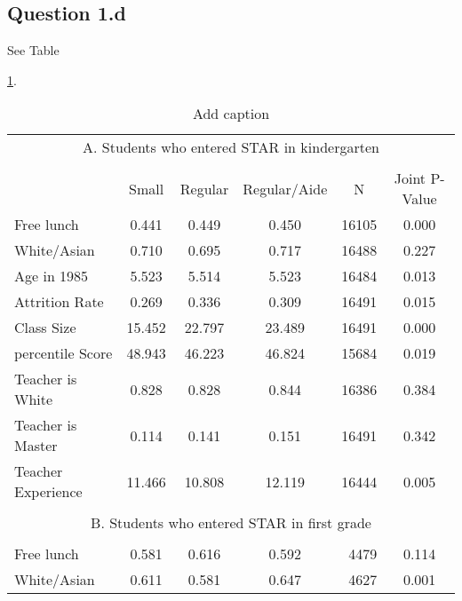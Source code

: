 \documentclass{article}
\begin{document}
{{{{{%

\subsection*{Question 1.d}

See Table {\ref{tab:sub6}.

\begin{table}[htbp]
  \centering
  \caption{Add caption}
  \label{tab:sub6}
    \begin{tabular}{llcccrc}
    \toprule
    \multicolumn{7}{c}{A. Students who entered STAR in kindergarten} \\
          &       &       &       &       &       &  \\
          &       & Small & Regular & Regular/Aide & \multicolumn{1}{c}{N} & Joint P-Value \\
    \midrule
    \multicolumn{2}{l}{Free lunch} & 0.441  & 0.449  & 0.450  & 16105 & 0.000  \\
    \multicolumn{2}{l}{White/Asian} & 0.710  & 0.695  & 0.717  & 16488 & 0.227  \\
    \multicolumn{2}{l}{Age in 1985} & 5.523  & 5.514  & 5.523  & 16484 & 0.013  \\
    \multicolumn{2}{l}{Attrition Rate} & 0.269  & 0.336  & 0.309  & 16491 & 0.015  \\
    \multicolumn{2}{l}{Class Size} & 15.452  & 22.797  & 23.489  & 16491 & 0.000  \\
    \multicolumn{2}{l}{percentile Score} & 48.943  & 46.223  & 46.824  & 15684 & 0.019  \\
    \multicolumn{2}{l}{Teacher is White} & 0.828  & 0.828  & 0.844  & 16386 & 0.384  \\
    \multicolumn{2}{l}{Teacher is Master} & 0.114  & 0.141  & 0.151  & 16491 & 0.342  \\
    \multicolumn{2}{l}{Teacher Experience} & 11.466  & 10.808  & 12.119  & 16444 & 0.005  \\
          &       &       &       &       &       &  \\
    \multicolumn{7}{c}{B. Students who entered STAR in first grade} \\
          &       &       &       &       &       &  \\
    \multicolumn{2}{l}{Free lunch} & 0.581  & 0.616  & 0.592  & 4479  & 0.114  \\
    \multicolumn{2}{l}{White/Asian} & 0.611  & 0.581  & 0.647  & 4627  & 0.001  \\

\end{tabular}
\end{table}}}}}}}
\end{document}
